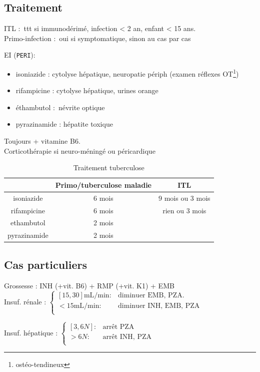 \subsection{Traitement}%

ITL : ttt si immunodérimé, infection < 2 an, enfant < 15 ans.\\
Primo-infection : oui si symptomatique, sinon au cas par cas

EI (\texttt{PERI}): 
\begin{itemize}
  \item isoniazide : cytolyse hépatique, neuropatie périph (examen réflexes
    OT\footnote{ostéo-tendineux})
  \item rifampicine : cytolyse hépatique, urines orange
  \item éthambutol : névrite optique
  \item pyrazinamide : hépatite toxique
\end{itemize}

Toujours + vitamine B6.\\
Corticothérapie si neuro-méningé ou péricardique

\begin{table}[htpb]
  \centering
  \caption{Traitement tuberculose}
  \begin{tabular}{*{3}{c}}
    \toprule
    & Primo/tuberculose maladie & ITL \\
    \midrule
 isoniazide & 6 mois & 9 mois ou 3 mois\\
 rifampicine & 6 mois & rien ou 3 mois \\
 ethambutol & 2 mois &\\
 pyrazinamide & 2 mois\\
 \bottomrule
  \end{tabular}
\end{table}

\subsection{Cas particuliers}
Grossesse : INH (+vit. B6) + RMP (+vit. K1) + EMB\\
Insuf. rénale :
$ \begin{cases}
    [15,30] \text{mL/min} : & \text{diminuer EMB, PZA}.\\
    < 15 \text{mL/min} : & \text{diminuer INH, EMB, PZA}\\
  \end{cases} $
  
Insuf. hépatique :
  $\begin{cases}
  [3,6N] : & \text{arrêt PZA}\\
  > 6N : & \text{arrêt INH, PZA}\\
\end{cases}$

